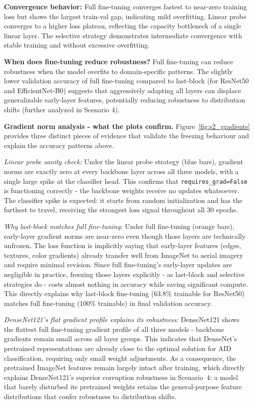 \documentclass[11pt, a4paper]{article}
\begin{document}
\textbf{Convergence behavior:} Full fine-tuning converges fastest to near-zero training loss but shows the largest train-val gap, indicating mild overfitting. Linear probe converges to a higher loss plateau, reflecting the capacity bottleneck of a single linear layer. The selective strategy demonstrates intermediate convergence with stable training and without excessive overfitting.

\textbf{When does fine-tuning reduce robustness?} Full fine-tuning can reduce robustness when the model overfits to domain-specific patterns. The slightly lower validation accuracy of full fine-tuning compared to last-block (for ResNet50 and EfficientNet-B0) suggests that aggressively adapting all layers can displace generalizable early-layer features, potentially reducing robustness to distribution shifts (further analyzed in Scenario 4).

\textbf{Gradient norm analysis - what the plots confirm.}
Figure~\ref{fig:s2_gradients} provides three distinct pieces of evidence that
validate the freezing behaviour and explain the accuracy patterns above.

\textit{Linear probe sanity check:} Under the linear probe strategy (blue
bars), gradient norms are exactly zero at every backbone layer across all
three models, with a single large spike at the classifier head. This
confirms that \texttt{requires\_grad=False} is functioning correctly -
the backbone weights receive no updates whatsoever. The classifier spike
is expected: it starts from random initialization and has the furthest
to travel, receiving the strongest loss signal throughout all 30 epochs.

\textit{Why last-block matches full fine-tuning:} Under full fine-tuning
(orange bars), early-layer gradient norms are near-zero even though those
layers are technically unfrozen. The loss function is implicitly saying
that early-layer features (edges, textures, color gradients) already
transfer well from ImageNet to aerial imagery and require minimal
revision. Since full fine-tuning's early-layer updates are negligible
in practice, freezing those layers explicitly - as last-block and
selective strategies do - costs almost nothing in accuracy while
saving significant compute. This directly explains why last-block
fine-tuning (63.8\% trainable for ResNet50) matches full fine-tuning
(100\% trainable) in final validation accuracy.

\textit{DenseNet121's flat gradient profile explains its robustness:}
DenseNet121 shows the flattest full fine-tuning gradient profile of all
three models - backbone gradients remain small across all layer groups.
This indicates that DenseNet's pretrained representations are already
close to the optimal solution for AID classification, requiring only
small weight adjustments. As a consequence, the pretrained ImageNet
features remain largely intact after training, which directly explains
DenseNet121's superior corruption robustness in Scenario~4: a model
that barely disturbed its pretrained weights retains the general-purpose
feature distributions that confer robustness to distribution shifts.
\end{document}
